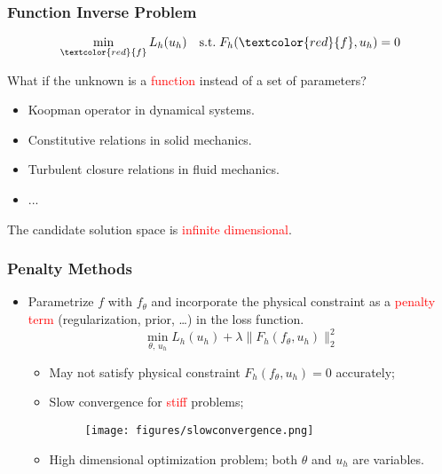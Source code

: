 \documentclass[usenames,dvipsnames]{beamer}
\begin{document}
\begin{frame}
	\frametitle{Function Inverse Problem}
	
	\begin{equation*}
		\min_{\textcolor{red}{f}} L_h(u_h) \quad \mathrm{s.t.}\; F_h(\textcolor{red}{f}, u_h) = 0
	\end{equation*}
	
	What if the unknown is a \textcolor{red}{function} instead of a set of parameters?
\begin{itemize}
	\item Koopman operator in dynamical systems.
	\item Constitutive relations in solid mechanics. 
	\item Turbulent closure relations in fluid mechanics.
	\item ...
\end{itemize}

The candidate solution space is \textcolor{red}{infinite dimensional}.

\end{frame}


\begin{frame}
	\frametitle{Penalty Methods}
	
	\begin{itemize}
		\item Parametrize $f$ with $f_\theta$ and incorporate the physical constraint as a \textcolor{red}{penalty term} (regularization, prior, \ldots) in the loss function.
		\begin{equation*}
	\min_{\theta,\,u_h} L_h(u_h) + \lambda\|F_h(f_\theta, u_h)\|_2^2
		\end{equation*}
		\begin{itemize}
			\item May not satisfy physical constraint $F_h(f_\theta, u_h)=0$ accurately;
			\item Slow convergence for \textcolor{red}{stiff} problems;
			\begin{figure}[hbt]
				\texttt{[image: figures/slowconvergence.png]}
			\end{figure}
			
			
			\item High dimensional optimization problem; both $\theta$ and $u_h$ are variables.
		\end{itemize}
	\end{itemize}
\end{frame}
\end{document}
